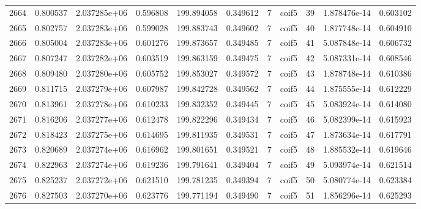 \begin{tabular}{lrrrrrrlrrr}
2664 &    0.800537 &        2.037285e+06 &  0.596808 &              199.894058 &    0.349612 &       7 &        coif5 &     39 &   1.878476e-14 &      0.603102 \\
2665 &    0.802757 &        2.037283e+06 &  0.599028 &              199.883743 &    0.349602 &       7 &        coif5 &     40 &   1.877748e-14 &      0.604910 \\
2666 &    0.805004 &        2.037283e+06 &  0.601276 &              199.873657 &    0.349485 &       7 &        coif5 &     41 &   5.087848e-14 &      0.606732 \\
2667 &    0.807247 &        2.037282e+06 &  0.603519 &              199.863159 &    0.349475 &       7 &        coif5 &     42 &   5.087331e-14 &      0.608546 \\
2668 &    0.809480 &        2.037280e+06 &  0.605752 &              199.853027 &    0.349572 &       7 &        coif5 &     43 &   1.878748e-14 &      0.610386 \\
2669 &    0.811715 &        2.037279e+06 &  0.607987 &              199.842728 &    0.349562 &       7 &        coif5 &     44 &   1.875555e-14 &      0.612229 \\
2670 &    0.813961 &        2.037278e+06 &  0.610233 &              199.832352 &    0.349445 &       7 &        coif5 &     45 &   5.083924e-14 &      0.614080 \\
2671 &    0.816206 &        2.037277e+06 &  0.612478 &              199.822296 &    0.349434 &       7 &        coif5 &     46 &   5.082399e-14 &      0.615923 \\
2672 &    0.818423 &        2.037275e+06 &  0.614695 &              199.811935 &    0.349531 &       7 &        coif5 &     47 &   1.873634e-14 &      0.617791 \\
2673 &    0.820689 &        2.037274e+06 &  0.616962 &              199.801651 &    0.349521 &       7 &        coif5 &     48 &   1.885532e-14 &      0.619646 \\
2674 &    0.822963 &        2.037274e+06 &  0.619236 &              199.791641 &    0.349404 &       7 &        coif5 &     49 &   5.093974e-14 &      0.621514 \\
2675 &    0.825237 &        2.037272e+06 &  0.621510 &              199.781235 &    0.349394 &       7 &        coif5 &     50 &   5.080774e-14 &      0.623384 \\
2676 &    0.827503 &        2.037270e+06 &  0.623776 &              199.771194 &    0.349490 &       7 &        coif5 &     51 &   1.856296e-14 &      0.625293 \\

\end{tabular}
